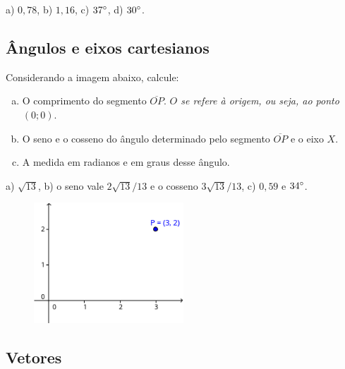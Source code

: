\documentclass[main.tex]{subfiles}
\begin{document}
\begin{gabarito}
	\begin{gabaritoQuestao}
		a) $0,78$, b) $1,16$, c) $37\degree$, d) $30\degree$.
	\end{gabaritoQuestao}
\end{gabarito}

\subsection*{Ângulos e eixos cartesianos}

\begin{questao}
Considerando a imagem abaixo, calcule:
\begin{enumerate}[a)]
\item O comprimento do segmento $\overline{OP}$. \textit{$O$ se refere à origem, ou seja, ao ponto $(0;0)$}.
\item O seno e o cosseno do ângulo determinado pelo segmento $\overline{OP}$ e o eixo $X$. 
\item A medida em radianos e em graus desse ângulo.
\end{enumerate}
\end{questao}

\begin{gabarito}
	\begin{gabaritoQuestao}
		a) $\sqrt{13}$, b) o seno vale $2\sqrt{13}/13$ e o cosseno $3\sqrt{13}/13$, c) $0,59$ e $34\degree$.
	\end{gabaritoQuestao}
\end{gabarito}

\begin{figure}[h]
\centering
\includegraphics[width=0.5\textwidth]{./img/c4q5.png}
\end{figure}

\subsection*{Vetores}
\end{document}
